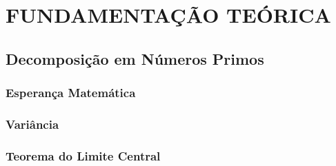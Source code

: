 \chapter{FUNDAMENTAÇÃO TEÓRICA}
\label{cap:fundamentacao-teorica}

  \section{Decomposição em Números Primos}
  
  
  	\subsection{Esperança Matemática}
  	
  	\subsection{Variância}
  	
  	\subsection{Teorema do Limite Central}
  	
  	
		

